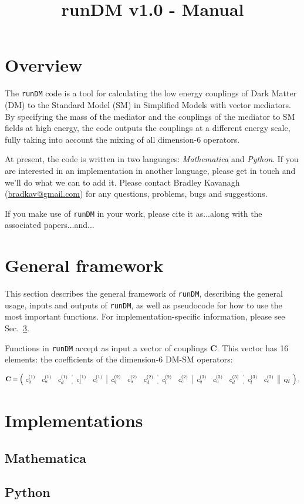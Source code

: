 \documentclass[notitlepage,12pt]{article}
\newcommand{\runDM}{\texttt{runDM}\xspace}
\begin{document}
\title{runDM v1.0 - Manual}
\maketitle


\section{Overview}

The \runDM code is a tool for calculating the low energy couplings of Dark Matter (DM) to the Standard Model (SM) in Simplified Models with vector mediators. By specifying the mass of the mediator and the couplings of the mediator to SM fields at high energy, the code outputs the couplings at a different energy scale, fully taking into account the mixing of all dimension-6 operators.

At present, the code is written in two languages: \textit{Mathematica} and \textit{Python}. If you are interested in an implementation in another language, please get in touch and we'll do what we can to add it. Please contact Bradley Kavanagh (\href{mailto:bradkav@gmail.com?subject=runDM v.10}{bradkav@gmail.com}) for any questions, problems, bugs and suggestions.

If you make use of \runDM in your work, please cite it as...along with the associated papers...and...



\section{General framework}

This section describes the general framework of \runDM, describing the general usage, inputs and outputs of \runDM, as well as pseudocode for how to use the most important functions. For implementation-specific information, please see Sec.~\ref{sec:implementations}.

Functions in \runDM accept as input a vector of couplings $\mathbf{C}$. This vector has 16 elements: the coefficients of the dimension-6 DM-SM operators:

\begin{equation}
\mathbf{C} = \left(\!\begin{array}{ccc:cc|ccc:cc|ccc:cc||c}
c_{ q}^{(1)} & c_{u}^{(1)} & c_{ d}^{(1)}\,&\, c_{ l}^{(1)} & c_{ e}^{(1)} \,&\, 
c_{ q}^{(2)} & c_{ u}^{(2)} & c_{ d}^{(2)} \,&\, c_{ l}^{(2)} & c_{ e}^{(2)} \,&\,
c_{ q}^{(3)} & c_{ u}^{(3)} & c_{ d}^{(3)} \,&\, c_{ l}^{(3)} & c_{ e}^{(3)} \,&\,
c_{ \!H} \end{array}\!\right),
\label{ed:cdef}
\end{equation}


\section{Implementations}
\label{sec:implementations}

\subsection{Mathematica}

\subsection{Python}
\end{document}
